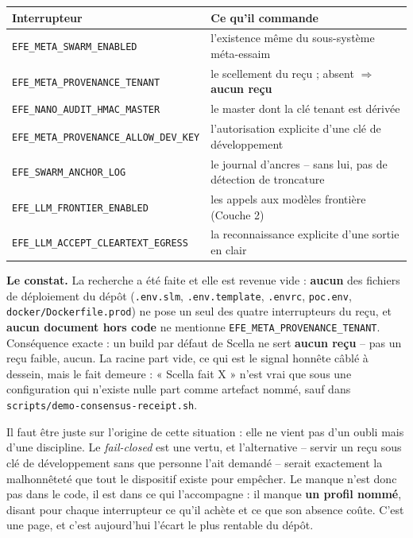 \documentclass[10pt]{article}
\newcommand{\code}[1]{\texttt{\small #1}}
\begin{document}
\begin{center}\small
\begin{tabular}{@{}l >{\raggedright\arraybackslash}p{9.9cm}@{}}
\toprule
\textbf{Interrupteur} & \textbf{Ce qu'il commande} \\
\midrule
\code{EFE\_META\_SWARM\_ENABLED}            & l'existence même du sous-système méta-essaim \\
\code{EFE\_META\_PROVENANCE\_TENANT}        & le scellement du reçu ; absent $\Rightarrow$ \textbf{aucun reçu} \\
\code{EFE\_NANO\_AUDIT\_HMAC\_MASTER}       & le master dont la clé tenant est dérivée \\
\code{EFE\_META\_PROVENANCE\_ALLOW\_DEV\_KEY} & l'autorisation explicite d'une clé de développement \\
\code{EFE\_SWARM\_ANCHOR\_LOG}              & le journal d'ancres -- sans lui, pas de détection de troncature \\
\code{EFE\_LLM\_FRONTIER\_ENABLED}          & les appels aux modèles frontière (Couche 2) \\
\code{EFE\_LLM\_ACCEPT\_CLEARTEXT\_EGRESS}  & la reconnaissance explicite d'une sortie en clair \\
\bottomrule
\end{tabular}
\end{center}

\begin{alerte}
\textbf{Le constat.} La recherche a été faite et elle est revenue vide : \textbf{aucun} des fichiers de
déploiement du dépôt (\code{.env.slm}, \code{.env.template}, \code{.envrc}, \code{poc.env},
\code{docker/Dockerfile.prod}) ne pose un seul des quatre interrupteurs du reçu, et \textbf{aucun
document hors code} ne mentionne \code{EFE\_META\_PROVENANCE\_TENANT}. Conséquence exacte : un build par
défaut de Scella ne sert \textbf{aucun reçu} -- pas un reçu faible, aucun. La racine part vide, ce qui
est le signal honnête câblé à dessein, mais le fait demeure : « Scella fait X » n'est vrai que sous une
configuration qui n'existe nulle part comme artefact nommé, sauf dans \code{scripts/demo-consensus-receipt.sh}.
\end{alerte}

Il faut être juste sur l'origine de cette situation : elle ne vient pas d'un oubli mais d'une
discipline. Le \emph{fail-closed} est une vertu, et l'alternative -- servir un reçu sous clé de
développement sans que personne l'ait demandé -- serait exactement la malhonnêteté que tout le
dispositif existe pour empêcher. Le manque n'est donc pas dans le code, il est dans ce qui l'accompagne :
il manque \textbf{un profil nommé}, disant pour chaque interrupteur ce qu'il achète et ce que son
absence coûte. C'est une page, et c'est aujourd'hui l'écart le plus rentable du dépôt.
\end{document}
